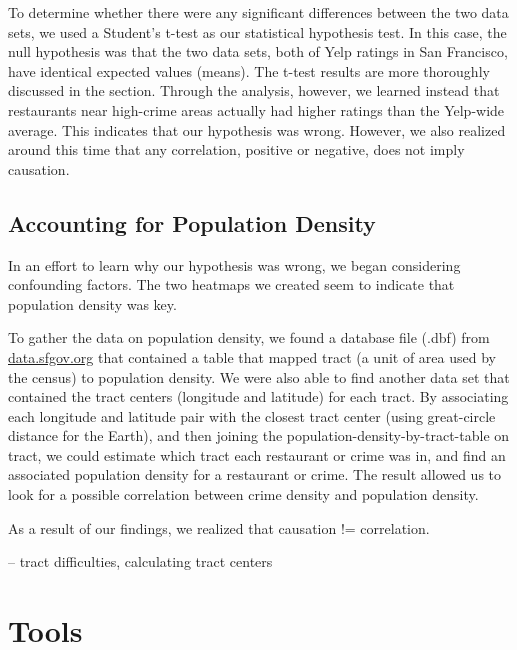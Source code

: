 \documentclass{article}
\begin{document}
To determine whether there were any significant differences between the two
data sets, we used a Student's t-test as our statistical hypothesis
test. In this case, the null hypothesis was that the two data sets, both of
Yelp ratings in San Francisco, have identical expected values (means). The
t-test results are more thoroughly discussed in the
\textbf{} section. Through the analysis, however, we
learned instead that restaurants near high-crime areas actually had higher
ratings than the Yelp-wide average. This indicates that our hypothesis was
wrong. However, we also realized around this time that any correlation,
positive or negative, does not imply causation.

\subsection{Accounting for Population Density}

In an effort to learn why our hypothesis was wrong, we began considering
confounding factors. The two heatmaps we created seem to indicate that
population density was key.


To gather the data on population density, we found a database file (.dbf)
from \url{data.sfgov.org} that contained a table that mapped tract (a unit
of area used by the census) to population density. We were also able to
find another data set that contained the tract centers (longitude and
latitude) for each tract. By associating each longitude and latitude pair
with the closest tract center (using great-circle distance for the Earth),
and then joining the population-density-by-tract-table on tract, we could
estimate which tract each restaurant or crime was in, and find an
associated population density for a restaurant or crime. The result allowed
us to look for a possible correlation between crime density and population
density.

As a result of our findings, we realized that causation != correlation.

-- tract difficulties, calculating tract centers

\section{Tools}
\end{document}
